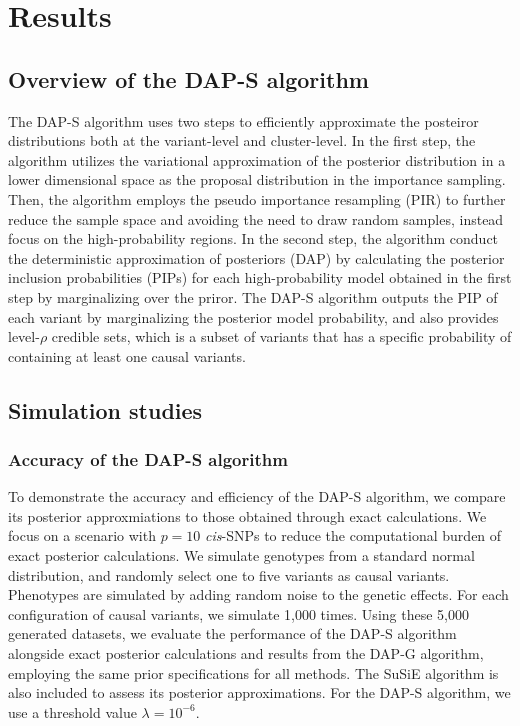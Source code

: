\documentclass[pdflatex,sn-mathphys-num]{sn-jnl}%
\theoremstyle{thmstyleone}%
\theoremstyle{thmstyletwo}%
\theoremstyle{thmstylethree}%
\begin{document}
\section{Results}\label{sec2}
\subsection{Overview of the DAP-S algorithm}\label{subsec1}
The DAP-S algorithm uses two steps to efficiently approximate the posteiror distributions both at the variant-level and cluster-level. In the first step, the algorithm utilizes the variational approximation of the posterior distribution in a lower dimensional space as the proposal distribution in the importance sampling. Then, the algorithm employs the pseudo importance resampling (PIR) to further reduce the sample space and avoiding the need to draw random samples, instead focus on the high-probability regions. In the second step, the algorithm conduct the deterministic approximation of posteriors (DAP) by calculating the posterior inclusion probabilities (PIPs) for each high-probability model obtained in the first step by marginalizing over the priror. The DAP-S algorithm outputs the PIP of each variant by marginalizing the posterior model probability, and also provides level-$\rho$ credible sets, which is a subset of variants that has a specific probability of containing at least one causal variants.





\subsection{Simulation studies}\label{subsec3}
\subsubsection*{Accuracy of the DAP-S algorithm}
To demonstrate the accuracy and efficiency of the DAP-S algorithm, we compare its posterior approxmiations to those obtained through exact calculations. We focus on a scenario with $p=10$ \textit{cis}-SNPs to reduce the computational burden of exact posterior calculations. We simulate genotypes from a standard normal distribution, and randomly select one to five variants as causal variants. Phenotypes are simulated by adding random noise to the genetic effects. For each configuration of causal variants, we simulate 1,000 times. Using these 5,000 generated datasets, we evaluate the performance of the DAP-S algorithm alongside exact posterior calculations and results from the DAP-G algorithm, employing the same prior specifications for all methods. The SuSiE algorithm is also included to assess its posterior approximations. For the DAP-S algorithm, we use a threshold value $\lambda=10^{-6}$.
\end{document}
